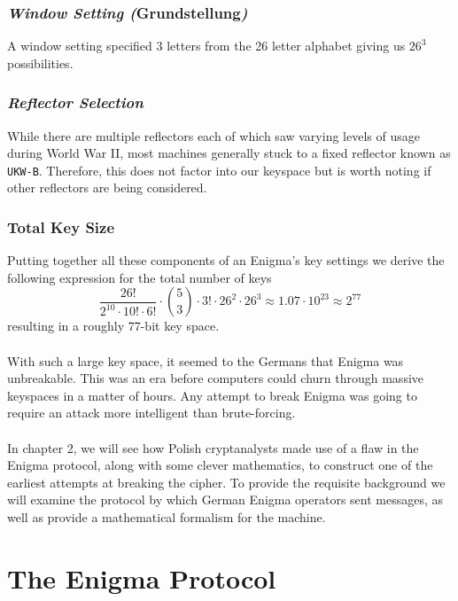 \subsubsection{\emph{Window Setting (}Grundstellung\emph{)}}
A window setting specified 3 letters from the 26 letter alphabet
giving us $26^3$ possibilities.

\subsubsection{\emph{Reflector Selection}}
While there are multiple reflectors each of which saw varying levels
of usage during World War II, most machines generally stuck to a
fixed reflector known as \texttt{UKW-B}. Therefore, this does not
factor into our keyspace but is worth noting if other reflectors are
being considered.

\subsubsection{Total Key Size}
Putting together all these components of an Enigma's key settings we
derive the following expression for the total number of keys
\[
  \frac{26!}{2^{10}\cdot 10! \cdot 6!}\cdot{5\choose 3}\cdot3!\cdot
  26^2\cdot 26^3 \approx 1.07 \cdot 10^{23} \approx 2^{77}
\]
resulting in a roughly $77$-bit key space.
\\\\With such a large key space, it seemed to the Germans that Enigma
was unbreakable. This was an era before computers could churn through
massive keyspaces in a matter of hours. Any attempt to break Enigma
was going to require an attack more intelligent than brute-forcing.
\\\\In chapter 2, we will see how Polish cryptanalysts made use of a
flaw in the Enigma protocol, along with some clever mathematics, to
construct one of the earliest attempts at breaking the cipher. To
provide the requisite background we will examine the protocol by
which German Enigma operators sent messages, as well as provide a
mathematical formalism for the machine.

\section{The Enigma Protocol}\label{protocol}

